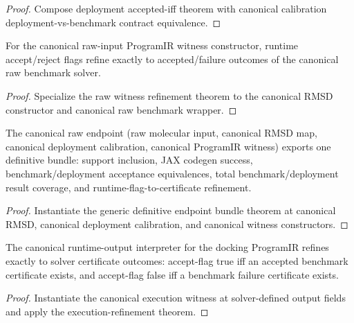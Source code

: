 \begin{proof}
Compose deployment accepted-iff theorem with canonical calibration deployment-vs-benchmark contract equivalence.
\end{proof}

\begin{theorem}\label{thm:canonical-raw-program-witness-refinement}
For the canonical raw-input ProgramIR witness constructor, runtime accept/reject flags refine exactly to accepted/failure outcomes of the canonical raw benchmark solver.
\end{theorem}

\begin{proof}
Specialize the raw witness refinement theorem to the canonical RMSD constructor and canonical raw benchmark wrapper.
\end{proof}

\begin{theorem}\label{thm:canonical-raw-definitive-endpoint-bundle}
The canonical raw endpoint (raw molecular input, canonical RMSD map, canonical deployment calibration, canonical ProgramIR witness) exports one definitive bundle: support inclusion, JAX codegen success, benchmark/deployment acceptance equivalences, total benchmark/deployment result coverage, and runtime-flag-to-certificate refinement.
\end{theorem}

\begin{proof}
Instantiate the generic definitive endpoint bundle theorem at canonical RMSD, canonical deployment calibration, and canonical witness constructors.
\end{proof}

\begin{theorem}\label{thm:canonical-runtime-output-refines-solver}
The canonical runtime-output interpreter for the docking ProgramIR refines exactly to solver certificate outcomes: accept-flag true iff an accepted benchmark certificate exists, and accept-flag false iff a benchmark failure certificate exists.
\end{theorem}

\begin{proof}
Instantiate the canonical execution witness at solver-defined output fields and apply the execution-refinement theorem.
\end{proof}

